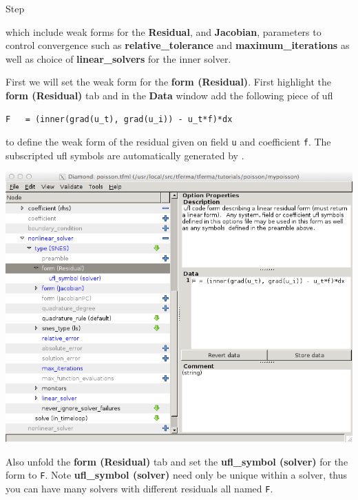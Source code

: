 \begin{steps}{Step}
\begin{center}
\end{center}
which include weak forms for the \textbf{Residual}, and
\textbf{Jacobian}, parameters to control convergence such as
\textbf{relative\_tolerance} and \textbf{maximum\_iterations} as well
as choice of \textbf{linear\_solvers} for the inner solver.

First we will set the weak form for the \textbf{form (Residual)}.
First highlight the  \textbf{form (Residual)} tab and in the
\textbf{Data} window add the following piece of ufl
\begin{lstlisting}[style=ufl]
F   = (inner(grad(u_t), grad(u_i)) - u_t*f)*dx
\end{lstlisting}
to define the weak form of the residual given on field \texttt{u} and
coefficient \texttt{f}.  The subscripted ufl symbols are automatically
generated by \TF{}. 
\begin{center}
    \includegraphics[width=\diamondwidth]{figures/screendumps/diamond_poisson_11c.png}
\end{center}
Also unfold the \textbf{form (Residual)} tab and set the
\textbf{ufl\_symbol (solver)} for the form to \texttt{F}.  Note
\textbf{ufl\_symbol (solver)} need only be unique within a solver,
thus you can have many solvers with different residuals all named \texttt{F}.


\end{steps}

